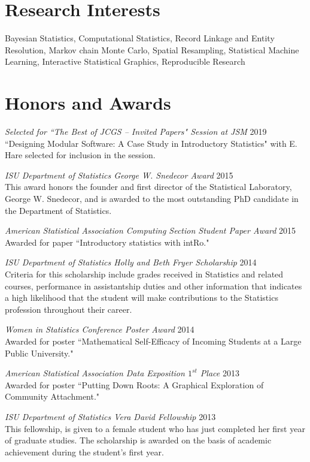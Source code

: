 \documentclass[margin,line]{res}
\begin{document}
\begin{resume}
\section{\sc Research Interests}
Bayesian Statistics, Computational Statistics, Record Linkage and Entity Resolution, Markov chain Monte Carlo, Spatial Resampling, Statistical Machine Learning, Interactive Statistical Graphics, Reproducible Research

\section{\sc Honors and Awards}
{\em Selected for ``The Best of JCGS -- Invited Papers" Session at JSM } \hfill 2019\\
``Designing Modular Software: A Case Study in Introductory Statistics" with E. Hare selected for inclusion in the session.

{\em ISU Department of Statistics George W. Snedecor Award } \hfill 2015\\
This award honors the founder and first director of the Statistical Laboratory, George W. Snedecor, and is awarded to the most outstanding PhD candidate in the Department of Statistics.

{\em American Statistical Association Computing Section Student Paper Award } \hfill 2015 \\
Awarded for paper ``Introductory statistics with intRo."

{\em ISU Department of Statistics Holly and Beth Fryer Scholarship } \hfill 2014\\
Criteria for this scholarship include grades received in Statistics and related courses, performance in assistantship duties and other information that indicates a high likelihood that the student will make contributions to the Statistics profession throughout their career.

{\em Women in Statistics Conference Poster Award } \hfill 2014\\
Awarded for poster ``Mathematical Self-Efficacy of Incoming Students at a Large Public University."

{\em American Statistical Association Data Exposition $1^{st}$ Place } \hfill 2013\\
Awarded for poster ``Putting Down Roots: A Graphical Exploration of Community Attachment."

{\em ISU Department of Statistics Vera David Fellowship } \hfill 2013\\
This fellowship, is given to a female student who has just completed her first year of graduate studies. The scholarship is awarded on the basis of academic achievement during the student’s first year.


\end{resume}
\end{document}
